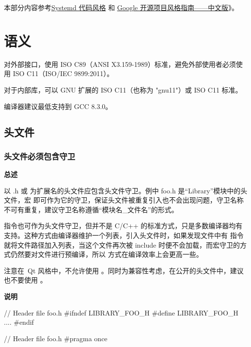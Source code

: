 \begin{DNote}
    本部分内容参考\href{https://raw.githubusercontent.com/systemd/systemd/main/docs/CODING_STYLE.md}{Systemd 代码风格} 和 \href{https://github.com/zh-google-styleguide/zh-google-styleguide}{Google 开源项目风格指南——中文版}》。
\end{DNote}

\chapter{语义}

对外部接口，使用 ISO C89（ANSI X3.159-1989）标准，避免外部使用者必须使用 ISO C11（ISO/IEC 9899:2011）。

对于内部库，可以 GNU 扩展的 ISO C11（也称为 "gnu11"）或 ISO C11 标准。

编译器建议最低支持到 GCC 8.3.0。

\section{头文件}

\subsection{头文件必须包含守卫}

\textbf{总述}

以 .h 或 为扩展名的头文件应包含头文件守卫。例中 foo.h 是“Library”模块中的头文件，宏  即可作为它的守卫，保证头文件被重复引入也不会出现问题，守卫名称不可有重复，建议守卫名称遵循“模块名\_文件名”的形式。

 指令也可作为头文件守卫，但并不是 C/C++ 的标准方式，只是多数编译器均有支持。这种方式由编译器维护一个列表，引入头文件时，如果发现文件中有   指令就将文件路径加入列表，当这个文件再次被 include 时便不会加载，而宏守卫的方式仍然要对文件进行预编译，所以   方式在编译效率上会更高一些。

\begin{DWarn}
注意在\deepin \ Qt 风格中，不允许使用 。同时为兼容性考虑，在公开的头文件中，建议也不要使用 。
\end{DWarn}

\textbf{说明}

\begin{ccode}
// Header file foo.h
#ifndef LIBRARY_FOO_H
#define LIBRARY_FOO_H
....
#endif

// Header file foo.h
#pragma once
\end{ccode}

